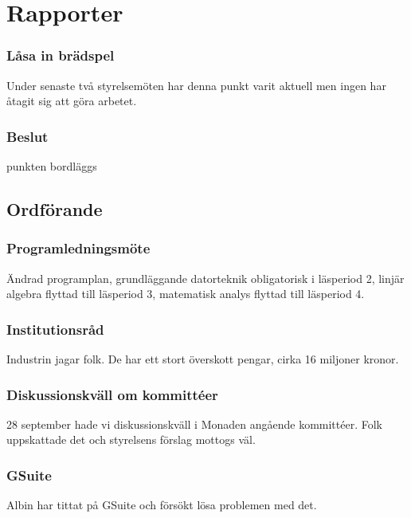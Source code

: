 \documentclass[protokoll]{dvd}
\begin{document}
\section{Rapporter}

\subsubsection{Låsa in brädspel}

Under senaste två styrelsemöten har denna punkt varit aktuell men ingen har åtagit sig att göra arbetet. 

\subsubsection*{Beslut}
\begin{attsatser}
    \item punkten bordläggs
\end{attsatser}









\newpage

\subsection{Ordförande}

\subsubsection{Programledningsmöte}
Ändrad programplan, grundläggande datorteknik obligatorisk i läsperiod 2, linjär algebra flyttad till läsperiod 3, matematisk analys flyttad till läsperiod 4.

\subsubsection{Institutionsråd}
Industrin jagar folk. De har ett stort överskott pengar, cirka 16 miljoner kronor.

\subsubsection{Diskussionskväll om kommittéer}
28 september hade vi diskussionskväll i Monaden angående kommittéer. Folk uppskattade det och styrelsens förslag mottogs väl.

\subsubsection{GSuite}
Albin har tittat på GSuite och försökt lösa problemen med det.
\end{document}

